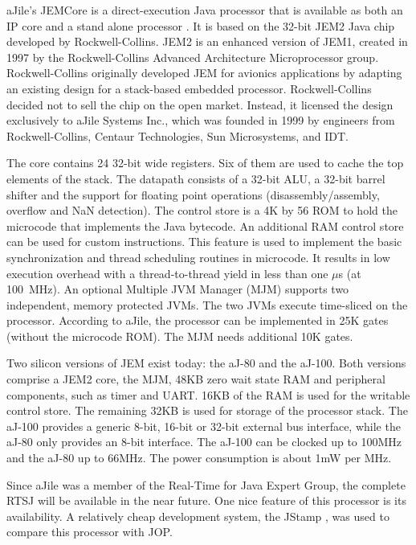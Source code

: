 aJile's JEMCore is a direct-execution Java processor that is
available as both an IP core and a stand alone processor
\cite{aJile, 880720}. It is based on the 32-bit JEM2 Java chip
developed by Rockwell-Collins. JEM2 is an enhanced version of JEM1,
created in 1997 by the Rockwell-Collins Advanced Architecture
Microprocessor group. Rockwell-Collins originally developed JEM for
avionics applications by adapting an existing design for a
stack-based embedded processor. Rockwell-Collins decided not to sell
the chip on the open market. Instead, it licensed the design
exclusively to aJile Systems Inc., which was founded in 1999 by
engineers from Rockwell-Collins, Centaur Technologies, Sun
Microsystems, and IDT.


The core contains 24 32-bit wide registers. Six of them are used to
cache the top elements of the stack. The datapath consists of a
32-bit ALU, a 32-bit barrel shifter and the support for floating
point operations (disassembly/assembly, overflow and NaN detection).
The control store is a 4K by 56 ROM to hold the microcode that
implements the Java bytecode. An additional RAM control store can be
used for custom instructions. This feature is used to implement the
basic synchronization and thread scheduling routines in microcode. It
results in low execution overhead with a thread-to-thread yield in
less than one $\mu$s (at 100~MHz). An optional Multiple JVM Manager
(MJM) supports two independent, memory protected JVMs. The two JVMs
execute time-sliced on the processor. According to aJile, the
processor can be implemented in 25K gates (without the microcode
ROM). The MJM needs additional 10K gates.

Two silicon versions of JEM exist today: the aJ-80 and the aJ-100.
Both versions comprise a JEM2 core, the MJM, 48KB zero wait state
RAM and peripheral components, such as timer and UART. 16KB of the
RAM is used for the writable control store. The remaining 32KB is
used for storage of the processor stack. The aJ-100 provides a
generic 8-bit, 16-bit or 32-bit external bus interface, while the
aJ-80 only provides an 8-bit interface. The aJ-100 can be clocked up
to 100MHz and the aJ-80 up to 66MHz. The power consumption is about
1mW per MHz.

Since aJile was a member of the Real-Time for Java Expert Group, the
complete RTSJ will be available in the near future. One nice feature
of this processor is its availability. A relatively cheap
development system, the JStamp \cite{JStamp}, was used to compare
this processor with JOP.

